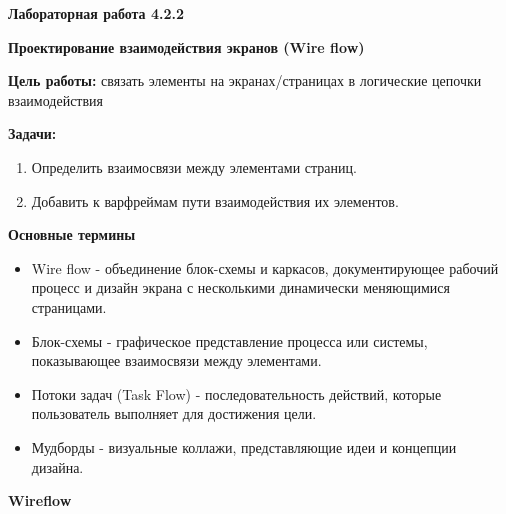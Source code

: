 
\graphicspath{ {4.2.2/models/} }

\pagestyle{fancy}
\fancyhead{}
\renewcommand{\headrulewidth}{0pt}


\begin{center}
    \textbf{Лабораторная работа 4.2.2}

    \textbf{Проектирование взаимодействия экранов (Wire flow)}
\end{center}

\textbf{Цель работы:} связать элементы на экранах/страницах в логические цепочки взаимодействия 
\bigskip

\textbf{Задачи:}

\begin{enumerate}
    \item Определить взаимосвязи между элементами страниц.
    \item Добавить к варфреймам пути взаимодействия их элементов.
\end{enumerate}
\bigskip

\textbf{Основные термины}

\begin{itemize}
    \item Wire flow - объединение блок-схемы и каркасов, документирующее рабочий процесс и дизайн экрана с несколькими динамически меняющимися страницами.
    \item Блок-схемы - графическое представление процесса или системы, показывающее взаимосвязи между элементами.
    \item Потоки задач (Task Flow) - последовательность действий, которые пользователь выполняет для достижения цели.
    \item Мудборды - визуальные коллажи, представляющие идеи и концепции дизайна.
\end{itemize}
\bigskip

\textbf{Wireflow}
\bigskip

\noindent
\begin{minipage}{\linewidth}
\end{minipage}
\bigskip

